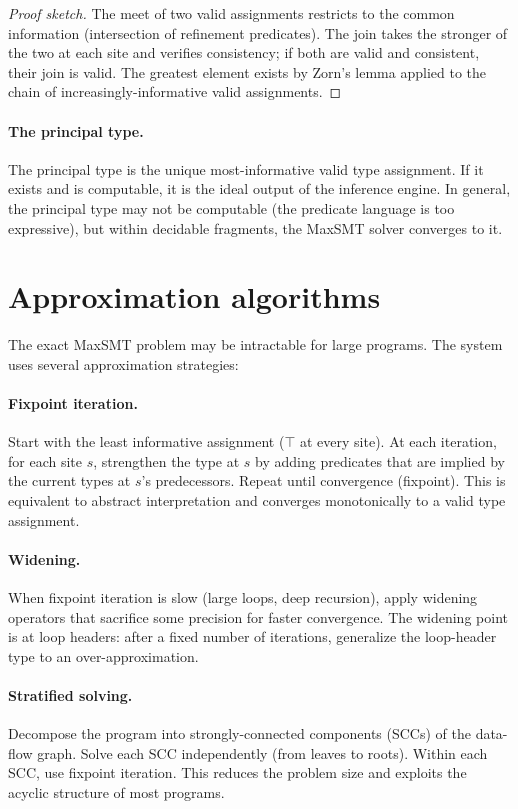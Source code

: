 \documentclass[11pt]{report}
\theoremstyle{definition}
\theoremstyle{plain}
\begin{document}
\begin{proof}[Proof sketch]
The meet of two valid assignments restricts to the common information
(intersection of refinement predicates). The join takes the stronger of the
two at each site and verifies consistency; if both are valid and consistent,
their join is valid. The greatest element exists by Zorn's lemma applied to
the chain of increasingly-informative valid assignments.
\end{proof}

\paragraph{The principal type.}
The principal type is the unique most-informative valid type assignment. If
it exists and is computable, it is the ideal output of the inference engine.
In general, the principal type may not be computable (the predicate language
is too expressive), but within decidable fragments, the MaxSMT solver
converges to it.

\section{Approximation algorithms}

The exact MaxSMT problem may be intractable for large programs. The system
uses several approximation strategies:

\paragraph{Fixpoint iteration.}
Start with the least informative assignment ($\top$ at every site). At each
iteration, for each site $s$, strengthen the type at $s$ by adding predicates
that are implied by the current types at $s$'s predecessors. Repeat until
convergence (fixpoint). This is equivalent to abstract interpretation and
converges monotonically to a valid type assignment.

\paragraph{Widening.}
When fixpoint iteration is slow (large loops, deep recursion), apply widening
operators that sacrifice some precision for faster convergence. The widening
point is at loop headers: after a fixed number of iterations, generalize the
loop-header type to an over-approximation.

\paragraph{Stratified solving.}
Decompose the program into strongly-connected components (SCCs) of the
data-flow graph. Solve each SCC independently (from leaves to roots). Within
each SCC, use fixpoint iteration. This reduces the problem size and exploits
the acyclic structure of most programs.
\end{document}
